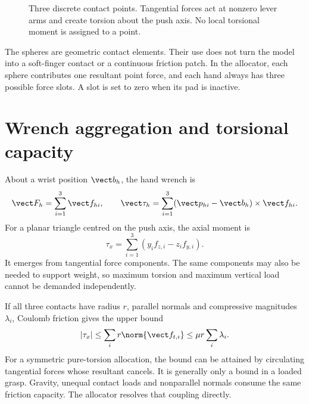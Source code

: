 \begin{figure}[htbp]\centering
{}
\caption{Three discrete contact points. Tangential forces act at nonzero lever arms and create torsion about the push axis. No local torsional moment is assigned to a point.}
\label{fig:tripad-geometry}
\end{figure}

The spheres are geometric contact elements. Their use does not turn the model into a soft-finger contact or a continuous friction patch. In the allocator, each sphere contributes one resultant point force, and each hand always has three possible force slots. A slot is set to zero when its pad is inactive.

\section{Wrench aggregation and torsional capacity}

About a wrist position $\vect b_h$, the hand wrench is
\begin{equation}
\vect F_h=\sum_{i=1}^3\vect f_{hi},\qquad
\vect\tau_h=\sum_{i=1}^3(\vect p_{hi}-\vect b_h)\times\vect f_{hi}.
\label{eq:hand-wrench}
\end{equation}
For a planar triangle centred on the push axis, the axial moment is
\begin{equation}
\tau_x=\sum_{i=1}^3(y_i f_{z,i}-z_i f_{y,i}).
\end{equation}
It emerges from tangential force components. The same components may also be needed to support weight, so maximum torsion and maximum vertical load cannot be demanded independently.

If all three contacts have radius $r$, parallel normals and compressive magnitudes $\lambda_i$, Coulomb friction gives the upper bound
\begin{equation}
|\tau_x|\leq \sum_i r\norm{\vect f_{t,i}}
\leq\mu r\sum_i\lambda_i.
\label{eq:torsion-bound}
\end{equation}
For a symmetric pure-torsion allocation, the bound can be attained by circulating tangential forces whose resultant cancels. It is generally only a bound in a loaded grasp. Gravity, unequal contact loads and nonparallel normals consume the same friction capacity. The allocator resolves that coupling directly.

